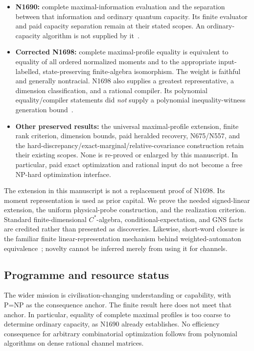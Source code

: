 \documentclass[11pt,a4paper]{article}
\theoremstyle{definition}\newtheorem{definition}[theorem]{Definition}
\begin{document}
\begin{itemize}
\item \textbf{N1690:} complete maximal-information evaluation and the separation between that information and ordinary quantum capacity. Its finite evaluator and paid capacity separation remain at their stated scopes. An ordinary-capacity algorithm is not supplied by it~\cite{N1690}.
\item \textbf{Corrected N1698:} complete maximal-profile equality is equivalent to equality of all ordered normalized moments and to the appropriate input-labelled, state-preserving finite-algebra isomorphism. The weight is faithful and generally nontracial. N1698 also supplies a greatest representative, a dimension classification, and a rational compiler. Its polynomial equality/compiler statements did \emph{not} supply a polynomial inequality-witness generation bound~\cite{N1698}.
\item \textbf{Other preserved results:} the universal maximal-profile extension, finite rank criterion, dimension bounds, paid heralded recovery, N675/N557, and the hard-discrepancy/exact-marginal/relative-covariance construction retain their existing scopes. None is re-proved or enlarged by this manuscript. In particular, paid exact optimization and rational input do not become a free NP-hard optimization interface.
\end{itemize}

The extension in this manuscript is not a replacement proof of N1698. Its moment representation is used as prior capital. We prove the needed signed-linear extension, the uniform physical-probe construction, and the realization criterion. Standard finite-dimensional $C^*$-algebra, conditional-expectation, and GNS facts are credited rather than presented as discoveries. Likewise, short-word closure is the familiar finite linear-representation mechanism behind weighted-automaton equivalence~\cite{Kiefer}; novelty cannot be inferred merely from using it for channels.

\subsection{Programme and resource status}

The wider mission is civilisation-changing understanding or capability, with P=NP as the consequence anchor. The finite result here does not meet that anchor. In particular, equality of complete maximal profiles is too coarse to determine ordinary capacity, as N1690 already establishes. No efficiency consequence for arbitrary combinatorial optimization follows from polynomial algorithms on dense rational channel matrices.
\end{document}
